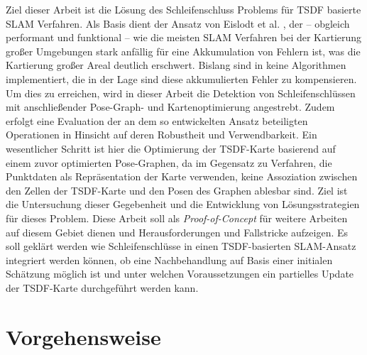 Ziel dieser Arbeit ist die Lösung des Schleifenschluss Problems für TSDF basierte SLAM Verfahren.
Als Basis dient der Ansatz von Eislodt et al. \cite{HATSDF}, der -- obgleich performant und funktional -- wie die meisten SLAM Verfahren bei der Kartierung großer Umgebungen stark anfällig für eine Akkumulation von Fehlern ist, was die Kartierung großer Areal deutlich erschwert. Bislang sind in \citep{HATSDF} keine Algorithmen implementiert, die in der Lage sind diese akkumulierten Fehler zu kompensieren. Um dies zu erreichen, wird in dieser Arbeit die Detektion von Schleifenschlüssen mit anschließender Pose-Graph- und Kartenoptimierung angestrebt. Zudem erfolgt eine Evaluation der an dem so entwickelten Ansatz beteiligten Operationen in Hinsicht auf deren Robustheit und Verwendbarkeit. Ein wesentlicher Schritt ist hier die Optimierung der TSDF-Karte basierend auf einem zuvor optimierten Pose-Graphen, da im Gegensatz zu Verfahren, die Punktdaten als Repräsentation der Karte verwenden, keine Assoziation zwischen den Zellen der TSDF-Karte und den Posen des Graphen ablesbar sind. Ziel ist die Untersuchung dieser Gegebenheit und die Entwicklung von Lösungsstrategien für dieses Problem. Diese Arbeit soll als \emph{Proof-of-Concept} für weitere Arbeiten auf diesem Gebiet dienen und Herausforderungen und Fallstricke aufzeigen. Es soll geklärt werden wie Schleifenschlüsse in einen TSDF-basierten SLAM-Ansatz integriert werden können, ob eine Nachbehandlung auf Basis einer initialen Schätzung möglich ist und unter welchen Voraussetzungen ein partielles Update der TSDF-Karte durchgeführt werden kann.

\section{Vorgehensweise}
\label{section:herangehensweise}

